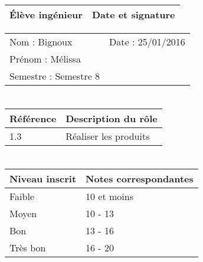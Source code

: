 \documentclass[11pt]{article}
\begin{document}

\begin{center}
\begin{table}[!hp]

	\begin{tabularx}{\linewidth}{|X|X|}
	\hline
	\rowcolor{gray!40} Élève ingénieur & Date et signature \\
	\hline
	\end{tabularx}
	\begin{tabularx}{\linewidth}{|X|X|}
	Nom : Bignoux & Date : 25/01/2016 \\ 
	Prénom : Mélissa & \\
	Semestre : Semestre 8 & \\
	\hline
	\end{tabularx}
\end{table}
\end{center}

\section*{\large\FR}

\begin{table}[!hp]
\centering
	\begin{tabularx}{\linewidth}{|X|X|}
	\hline
	\rowcolor{gray!40} Référence \WBSCourt & Description du rôle \\
	\hline
	 1.3 & Réaliser les produits \\
	 \hline
	\end{tabularx}
\end{table}


\section*{\large\FC}


\begin{table}[!hp]
\centering
	\begin{tabularx}{\linewidth}{|X|X|}
	\hline
	\rowcolor{gray!40} Niveau inscrit & Notes correspondantes \\
	\hline
	 Faible & 10 et moins \\
	 \hline
	 Moyen & 10 - 13 \\
	 \hline
	 Bon & 13 - 16 \\
	 \hline
	 Très bon & 16 - 20 \\
	 \hline
	\end{tabularx}
\end{table}
\end{document}
